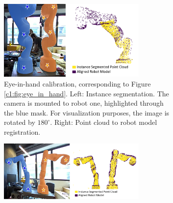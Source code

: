 




\begin{figure}
     \centering
     \begin{subfigure}[b]{\textwidth}
         \centering
         \includegraphics[width=0.8\textwidth]{img/visual_calibration/self_registration_combined_white.png}
         \caption{Eye-in-hand calibration, corresponding to Figure \ref{c1:fig:eye_in_hand}. Left: Instance segmentation. The camera is mounted to robot one, highlighted through the blue mask. For visualization purposes, the image is rotated by $180^{\circ}$. Right: Point cloud to robot model registration.}
         \label{c1:fig:self_registration}
     \end{subfigure}
     \hfill
     \begin{subfigure}[b]{\textwidth}
         \centering
         \includegraphics[width=0.8\textwidth]{img/visual_calibration/double_registration_combined_white.png}

\end{subfigure}
\end{figure}

